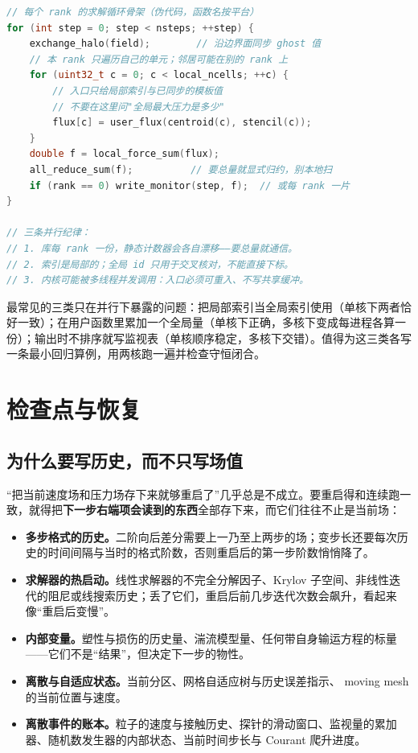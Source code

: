 \documentclass[12pt,a4paper,fontset=fandol]{ctexbook}
\begin{document}
\begin{lstlisting}[language=C++, style=cppstyle,
  caption={halo 同步与按 rank 加载的用户函数：调用形状要点清单},
  label={lst:ch08-halo-shape}]
// 每个 rank 的求解循环骨架（伪代码，函数名按平台）
for (int step = 0; step < nsteps; ++step) {
    exchange_halo(field);        // 沿边界面同步 ghost 值
    // 本 rank 只遍历自己的单元；邻居可能在别的 rank 上
    for (uint32_t c = 0; c < local_ncells; ++c) {
        // 入口只给局部索引与已同步的模板值
        // 不要在这里问"全局最大压力是多少"
        flux[c] = user_flux(centroid(c), stencil(c));
    }
    double f = local_force_sum(flux);
    all_reduce_sum(f);          // 要总量就显式归约，别本地扫
    if (rank == 0) write_monitor(step, f);  // 或每 rank 一片
}

// 三条并行纪律：
// 1. 库每 rank 一份，静态计数器会各自漂移——要总量就通信。
// 2. 索引是局部的；全局 id 只用于交叉核对，不能直接下标。
// 3. 内核可能被多线程并发调用：入口必须可重入、不写共享缓冲。
\end{lstlisting}

\begin{note}[title={``能跑通单核''不等于``能跑通并行''}]
最常见的三类只在并行下暴露的问题：把局部索引当全局索引使用（单核下两者恰好一致）；在用户函数里累加一个全局量（单核下正确，多核下变成每进程各算一份）；输出时不排序就写监视表（单核顺序稳定，多核下交错）。值得为这三类各写一条最小回归算例，用两核跑一遍并检查守恒闭合。
\end{note}

\section{检查点与恢复}
\label{sec:ch08-checkpoint}

\subsection*{为什么要写历史，而不只写场值}

``把当前速度场和压力场存下来就够重启了''几乎总是不成立。要重启得和连续跑一致，就得把\textbf{下一步右端项会读到的东西}全部存下来，而它们往往不止是当前场：

\begin{itemize}
\item \textbf{多步格式的历史。}二阶向后差分需要上一乃至上两步的场；变步长还要每次历史的时间间隔与当时的格式阶数，否则重启后的第一步阶数悄悄降了。
\item \textbf{求解器的热启动。}线性求解器的不完全分解因子、Krylov 子空间、非线性迭代的阻尼或线搜索历史；丢了它们，重启后前几步迭代次数会飙升，看起来像``重启后变慢''。
\item \textbf{内部变量。}塑性与损伤的历史量、湍流模型量、任何带自身输运方程的标量——它们不是``结果''，但决定下一步的物性。
\item \textbf{离散与自适应状态。}当前分区、网格自适应树与历史误差指示、 moving mesh 的当前位置与速度。
\item \textbf{离散事件的账本。}粒子的速度与接触历史、探针的滑动窗口、监视量的累加器、随机数发生器的内部状态、当前时间步长与 Courant 爬升进度。
\end{itemize}
\end{document}
